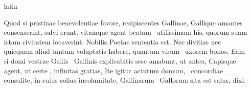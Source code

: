 \documentclass[12pt]{book}
\renewenvironment{latin}
    	{\begin{hyphenrules}{latin}}
    	{\end{hyphenrules}}
\begin{document}
\begin{pages}
\begin{latin}
\begin{Leftside}
                        Quod si pristinae benevolentiae favore, resipiscentes Gallinae, Gallique amantes consenserint, salvi erunt, vitamque agent beatam ﻿\ampersand\ utilissimam his, 
                        quorum  suam istam civitatem locaverint. 
                        Nobilis Poetae sententia est. Nec divitias nec quicquam aliud tantum voluptatis habere, quantum virum ﻿\ampersand\ uxorem bonos. 
                        Eam si domi vestrae Gallis ﻿\ampersand\ Gallinis explicabitis sese amabunt, ut antea, 
                        Capisque agent, ut certe , infinitas gratias, 
                        Ite igitur actutum domum, ﻿\ampersand\ concordiae consulite, 
                        in cuius solius incolumitate, Gallinarum ﻿\ampersand\ Gallorum sita est salus, dixi.
                    \pend 
        \endnumbering
        \end{Leftside}
        \end{latin}


\end{pages}
\end{document}
